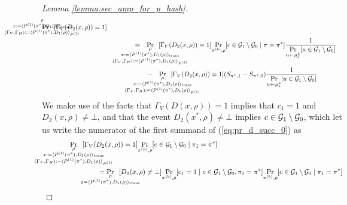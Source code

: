 \begin{proof}[Lemma \ref{lemma:sec_amp_for_p_hash}]
\begin{align}
{  \mathclap{
    \substack{\rho \\ x := \langle P^{(1)}(\pi^*), D_1(\rho) \rangle_{\text{trans}}
      \\ (\Gamma_V, \Gamma_H) := \langle P^{(1)}(\pi^*), D_1(\rho) \rangle_{P^{(1)}} }}}
{\Pr}\mkern13mu[\Gamma_V(D_2(x, \rho)) = 1] \notag\\
%
&\IndII = \mkern13mu
  \underset{
    \mathclap{
      \substack{\rho \\ x := \langle P^{(1)}(\pi^*), D_1 (\rho) \rangle_{\text{trans}}
        \\ (\Gamma_V, \Gamma_H) := \langle P^{(1)}(\pi^*), D_1 (\rho) \rangle_{P^{(1)}} }}}
  {\Pr}\mkern13mu[\Gamma_V(D_2(x, \rho)) = 1]
  \underset{\pi^{(k)},\rho}{\Pr}[c \in \cG_1 \setminus \cG_0 \mid \pi = \pi^*]
\frac{1}{
  \underset{u \leftarrow \mu_{\delta}^k}{\Pr}[ u \in \cG_1 \setminus \cG_0]
}\notag\\
%
&\IndIII - \mkern13mu
\underset{
  \mathclap{
  \substack{\rho \\ x := \langle P^{(1)}(\pi^*), D_1(\rho) \rangle_{\text{trans}}
    \\ (\Gamma_V, \Gamma_H) := \langle P^{(1)}(\pi^*), D_1(\rho) \rangle_{P^{(1)}} }}}
{\Pr}\mkern13mu[\Gamma_V(D_2(x, \rho)) = 1](S_{\pi^*,1} - S_{\pi^*,0})
\frac{1}{
\underset{u \leftarrow \mu_{\delta}^k}{\Pr}[ u \in \cG_1 \setminus\cG_0]
}
\end{align}
We make use of the facts that $\Gamma_V(D(x,\rho)) = 1$ implies that $c_1 = 1$ and $D_2(x,\rho) \neq \bot$, and that
the event $D_2(x^*, \rho) \neq \bot$ implies $c \in \mathcal{G}_1 \setminus \mathcal{G}_0$, which let us
write the numerator of the first summand of (\ref{eq:pr_d_succ_0}) as
\begin{align}
\IndII &\underset{
  \mathclap{
  \substack{\rho \\
    x := \langle P^{(1)}(\pi^*), D_1 (\rho) \rangle_{\text{trans}} \\
    (\Gamma_V, \Gamma_H) := \langle P^{(1)}(\pi^*), D_1(\rho) \rangle_{P^{(1)}} }}}
{\Pr}\mkern13mu[\Gamma_V(D_2(x, \rho)) = 1]
\underset{\pi^{(k)},\rho}{\Pr}[c \in \cG_1 \setminus \cG_0 \mid \pi_1 = \pi^*] \notag\\
  &\IndII = \underset{\mathclap{\substack{\rho
      \\ x = \langle P^{(1)}(\pi^*), D_1(\rho) \rangle_{\text{trans}}}}}
  {\Pr}\mkern13mu[D_2(x,\rho) \neq \bot]
  \underset{\pi^{(k)}, \rho}{\Pr}[c_1 = 1 \mid c \in \cG_1 \setminus \cG_0, \pi_1 = \pi^*]
  \underset{\pi^{(k)}, \rho}{\Pr}[c \in \cG_1 \setminus \cG_0 \mid \pi_1 = \pi^*]
\end{align}

\end{proof}
